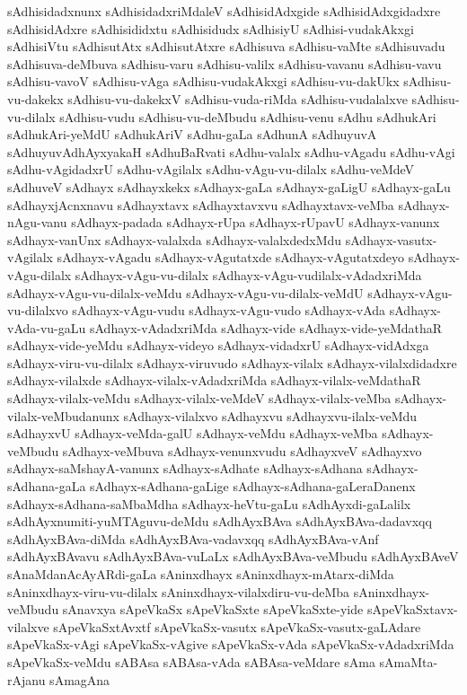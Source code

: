 {sAdhisidadxnunx
sAdhisidadxriMdaleV
sAdhisidAdxgide
sAdhisidAdxgidadxre
sAdhisidAdxre
sAdhisididxtu
sAdhisidudx
sAdhisiyU
sAdhisi-vudakAkxgi
sAdhisiVtu
sAdhisutAtx
sAdhisutAtxre
sAdhisuva
sAdhisu-vaMte
sAdhisuvadu
sAdhisuva-deMbuva
sAdhisu-varu
sAdhisu-valilx
sAdhisu-vavanu
sAdhisu-vavu
sAdhisu-vavoV
sAdhisu-vAga
sAdhisu-vudakAkxgi
sAdhisu-vu-dakUkx
sAdhisu-vu-dakekx
sAdhisu-vu-dakekxV
sAdhisu-vuda-riMda
sAdhisu-vudalalxve
sAdhisu-vu-dilalx
sAdhisu-vudu
sAdhisu-vu-deMbudu
sAdhisu-venu
sAdhu
sAdhukAri
sAdhukAri-yeMdU
sAdhukAriV
sAdhu-gaLa
sAdhunA
sAdhuyuvA
sAdhuyuvAdhAyxyakaH
sAdhuBaRvati
sAdhu-valalx
sAdhu-vAgadu
sAdhu-vAgi
sAdhu-vAgidadxrU
sAdhu-vAgilalx
sAdhu-vAgu-vu-dilalx
sAdhu-veMdeV
sAdhuveV
sAdhayx
sAdhayxkekx
sAdhayx-gaLa
sAdhayx-gaLigU
sAdhayx-gaLu
sAdhayxjAcnxnavu
sAdhayxtavx
sAdhayxtavxvu
sAdhayxtavx-veMba
sAdhayx-nAgu-vanu
sAdhayx-padada
sAdhayx-rUpa
sAdhayx-rUpavU
sAdhayx-vanunx
sAdhayx-vanUnx
sAdhayx-valalxda
sAdhayx-valalxdedxMdu
sAdhayx-vasutx-vAgilalx
sAdhayx-vAgadu
sAdhayx-vAgutatxde
sAdhayx-vAgutatxdeyo
sAdhayx-vAgu-dilalx
sAdhayx-vAgu-vu-dilalx
sAdhayx-vAgu-vudilalx-vAdadxriMda
sAdhayx-vAgu-vu-dilalx-veMdu
sAdhayx-vAgu-vu-dilalx-veMdU
sAdhayx-vAgu-vu-dilalxvo
sAdhayx-vAgu-vudu
sAdhayx-vAgu-vudo
sAdhayx-vAda
sAdhayx-vAda-vu-gaLu
sAdhayx-vAdadxriMda
sAdhayx-vide
sAdhayx-vide-yeMdathaR
sAdhayx-vide-yeMdu
sAdhayx-videyo
sAdhayx-vidadxrU
sAdhayx-vidAdxga
sAdhayx-viru-vu-dilalx
sAdhayx-viruvudo
sAdhayx-vilalx
sAdhayx-vilalxdidadxre
sAdhayx-vilalxde
sAdhayx-vilalx-vAdadxriMda
sAdhayx-vilalx-veMdathaR
sAdhayx-vilalx-veMdu
sAdhayx-vilalx-veMdeV
sAdhayx-vilalx-veMba
sAdhayx-vilalx-veMbudanunx
sAdhayx-vilalxvo
sAdhayxvu
sAdhayxvu-ilalx-veMdu
sAdhayxvU
sAdhayx-veMda-galU
sAdhayx-veMdu
sAdhayx-veMba
sAdhayx-veMbudu
sAdhayx-veMbuva
sAdhayx-venunxvudu
sAdhayxveV
sAdhayxvo
sAdhayx-saMshayA-vanunx
sAdhayx-sAdhate
sAdhayx-sAdhana
sAdhayx-sAdhana-gaLa
sAdhayx-sAdhana-gaLige
sAdhayx-sAdhana-gaLeraDanenx
sAdhayx-sAdhana-saMbaMdha
sAdhayx-heVtu-gaLu
sAdhAyxdi-gaLalilx
sAdhAyxnumiti-yuMTAguvu-deMdu
sAdhAyxBAva
sAdhAyxBAva-dadavxqq
sAdhAyxBAva-diMda
sAdhAyxBAva-vadavxqq
sAdhAyxBAva-vAnf
sAdhAyxBAvavu
sAdhAyxBAva-vuLaLx
sAdhAyxBAva-veMbudu
sAdhAyxBAveV
sAnaMdanAcAyARdi-gaLa
sAninxdhayx
sAninxdhayx-mAtarx-diMda
sAninxdhayx-viru-vu-dilalx
sAninxdhayx-vilalxdiru-vu-deMba
sAninxdhayx-veMbudu
sAnavxya
sApeVkaSx
sApeVkaSxte
sApeVkaSxte-yide
sApeVkaSxtavx-vilalxve
sApeVkaSxtAvxtf
sApeVkaSx-vasutx
sApeVkaSx-vasutx-gaLAdare
sApeVkaSx-vAgi
sApeVkaSx-vAgive
sApeVkaSx-vAda
sApeVkaSx-vAdadxriMda
sApeVkaSx-veMdu
sABAsa
sABAsa-vAda
sABAsa-veMdare
sAma
sAmaMta-rAjanu
sAmagAna
}
